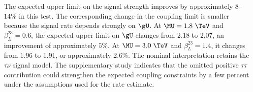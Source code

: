 The expected upper limit on the signal strength improves by approximately $8$--$14\%$ in this test.
The corresponding change in the coupling limit is smaller because the signal rate depends strongly on $\gU$.
At $\MU=1.8~\TeV$ and $\beta_L^{23}=0.6$, the expected upper limit on $\gU$ changes from 2.18 to 2.07, an improvement of approximately $5\%$.
At $\MU=3.0~\TeV$ and $\beta_L^{23}=1.4$, it changes from 1.96 to 1.91, or approximately $2.6\%$.
The nominal interpretation retains the $\tau\nu$ signal model.
The supplementary study indicates that the omitted positive $\tau\tau$ contribution could strengthen the expected coupling constraints by a few percent under the assumptions used for the rate estimate.
